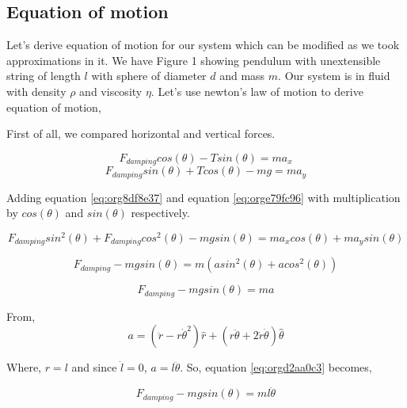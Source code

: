\documentclass{article}
\begin{document}
\subsection{Equation of motion}
\label{sec:org6e50c3b}

Let's derive equation of motion for our system which can be modified as we took approximations in it. We have Figure 1 showing pendulum with unextensible string of length \(l\) with sphere of diameter \(d\) and mass \(m\). Our system is in fluid with density \(\rho\) and viscosity \(\eta\). Let's use newton's law of motion to derive equation of motion,

First of all, we compared horizontal and vertical forces.

\begin{equation}
\label{eq:org8df8e37}
   F_{damping}cos(\theta)-Tsin(\theta)=ma_{x}
\end{equation}
\begin{equation}
\label{eq:orge79fc96}
   F_{damping}sin(\theta)+Tcos(\theta)-mg=ma_{y}
\end{equation}

Adding equation \ref{eq:org8df8e37} and equation \ref{eq:orge79fc96} with multiplication by \(cos(\theta)\) and \(sin(\theta)\) respectively.

\begin{equation*}
\label{eq:org5cc3317}
F_{damping}sin^{2}(\theta)+F_{damping}cos^{2}(\theta)-mgsin(\theta)=ma_{x}cos(\theta)+ma_{y}sin(\theta)
\end{equation*}

\begin{equation*}
\label{eq:org5fcf6b1}
F_{damping}-mgsin(\theta)=m(asin^{2}(\theta)+acos^{2}(\theta))
\end{equation*}

\begin{equation}
\label{eq:orgd2aa0c3}
F_{damping}-mgsin(\theta)=ma
\end{equation}

From,
\begin{equation*}
\label{eq:orgacf3267}
a = (\ddot{r}-r\dot{\theta}^{2})\hat{r} + (r \ddot{\theta}+2\dot{r}\dot{\theta})\hat{\theta}
\end{equation*}

Where,  \(r=l\) and since \(\dot{l}=0\), \(a=l\ddot{\theta}\). So, equation \ref{eq:orgd2aa0c3} becomes,

\begin{equation}
\label{eq:org2f6bde8}
F_{damping}-mgsin(\theta)=ml\ddot{\theta}
\end{equation}
\end{document}
